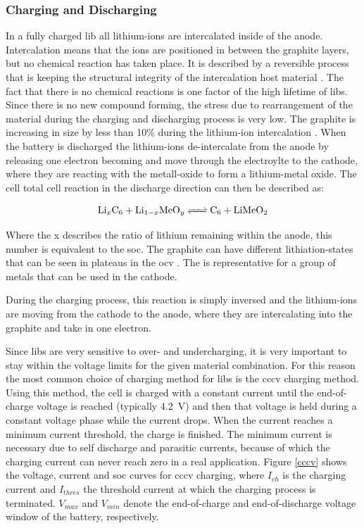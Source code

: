 \subsubsection{Charging and Discharging}
In a fully charged \gls{lib} all lithium-ions are intercalated inside of the anode. Intercalation means that the ions are positioned in between the graphite layers, but no chemical reaction has taken place. It is described by a reversible process that is keeping the structural integrity of the intercalation host material \cite{Li.2019}. The fact that there is no chemical reactions  is one factor of the high lifetime of \glspl{lib}. Since there is no new compound forming, the stress due to rearrangement of the material during the charging and discharging process is very low. The graphite is increasing in size by less than 10\% during the lithium-ion intercalation \cite{Winter.1998}. When the battery is discharged the lithium-ions de-intercalate from the anode by releasing one electron becoming  and move through the electroylte to the cathode, where they are reacting with the metall-oxide to form a lithium-metal oxide. The cell total cell reaction in the discharge direction can then be described as:

\begin{align*}
\ce{Li_xC6 + Li_{1-x}MeO_y <=> C6 + LiMeO2}
\end{align*}

Where the x describes the ratio of lithium remaining within the anode, this number is equivalent to the \gls{soc}. The graphite can have different lithiation-states that can be seen in plateaus in the \gls{ocv} \cite{Bauer.2016}. The  is representative for a group of metals that can be used in the cathode. \par
During the charging process, this reaction is simply inversed and the lithium-ions are moving from the cathode to the anode, where they are intercalating into the graphite and take in one electron. \par
Since \glspl{lib} are very sensitive to over- and undercharging, it is very important to stay within the voltage limits for the given material combination. For this reason the most common choice of charging method for \glspl{lib} is the \gls{cccv} charging method. Using this method, the cell is charged with a constant current until the end-of-charge voltage is reached (typically \SI{4.2}{\volt}) and then that voltage is held during a constant voltage phase while the current drops. When the current reaches a minimum current threshold, the charge is finished. The minimum current is necessary due to self discharge and parasitic currents, because of which the charging current can never reach zero in a real application. Figure \ref{cccv} shows the voltage, current and \gls{soc} curves for \gls{cccv} charging, where $I_{ch}$ is the charging current and $I_{thres}$ the threshold current at which the charging process is terminated. $V_{max}$ and $V_{min}$ denote the end-of-charge and end-of-discharge voltage window of the battery, respectively.

